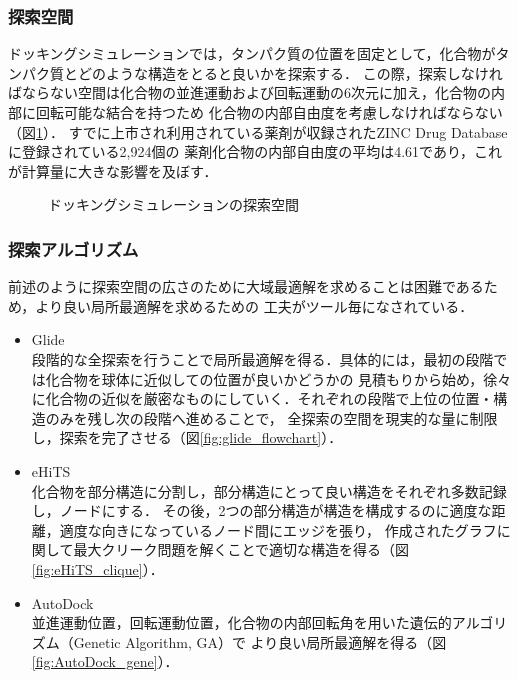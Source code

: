 \subsubsection{探索空間}
ドッキングシミュレーションでは，タンパク質の位置を固定として，化合物がタンパク質とどのような構造をとると良いかを探索する．
この際，探索しなければならない空間は化合物の並進運動および回転運動の6次元に加え，化合物の内部に回転可能な結合を持つため
化合物の内部自由度を考慮しなければならない（図\ref{fig:docking_freedom}）．
すでに上市され利用されている薬剤が収録されたZINC Drug Databaseに登録されている2,924個の
薬剤化合物の内部自由度の平均は4.61であり，これが計算量に大きな影響を及ぼす．

\begin{figure}[tb]
 \begin{center}
  \caption{ドッキングシミュレーションの探索空間}
  \label{fig:docking_freedom}
 \end{center}
\end{figure}


\subsubsection{探索アルゴリズム}
前述のように探索空間の広さのために大域最適解を求めることは困難であるため，より良い局所最適解を求めるための
工夫がツール毎になされている．
\begin{itemize}
\item Glide\cite{Friesner2004}\\
	段階的な全探索を行うことで局所最適解を得る．具体的には，最初の段階では化合物を球体に近似しての位置が良いかどうかの
	見積もりから始め，徐々に化合物の近似を厳密なものにしていく．それぞれの段階で上位の位置・構造のみを残し次の段階へ進めることで，
	全探索の空間を現実的な量に制限し，探索を完了させる（図\ref{fig:glide_flowchart}）．
\item eHiTS\cite{Zsoldos2007}\\
	化合物を部分構造に分割し，部分構造にとって良い構造をそれぞれ多数記録し，ノードにする．
	その後，2つの部分構造が構造を構成するのに適度な距離，適度な向きになっているノード間にエッジを張り，
	作成されたグラフに関して最大クリーク問題を解くことで適切な構造を得る（図\ref{fig:eHiTS_clique}）．
\item AutoDock\cite{Morris2009}\\
	並進運動位置，回転運動位置，化合物の内部回転角を用いた遺伝的アルゴリズム（Genetic Algorithm, GA）で
	より良い局所最適解を得る（図\ref{fig:AutoDock_gene}）．
\end{itemize}

